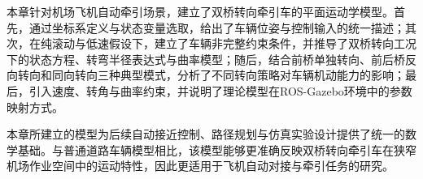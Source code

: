 本章针对机场飞机自动牵引场景，建立了双桥转向牵引车的平面运动学模型。首先，通过坐标系定义与状态变量选取，给出了车辆位姿与控制输入的统一描述；其次，在纯滚动与低速假设下，建立了车辆非完整约束条件，并推导了双桥转向工况下的状态方程、转弯半径表达式与曲率模型；随后，结合前桥单独转向、前后桥反向转向和同向转向三种典型模式，分析了不同转向策略对车辆机动能力的影响；最后，引入速度、转角与曲率约束，并说明了理论模型在ROS-Gazebo环境中的参数映射方式。

本章所建立的模型为后续自动接近控制、路径规划与仿真实验设计提供了统一的数学基础。与普通道路车辆模型相比，该模型能够更准确反映双桥转向牵引车在狭窄机场作业空间中的运动特性，因此更适用于飞机自动对接与牵引任务的研究。
